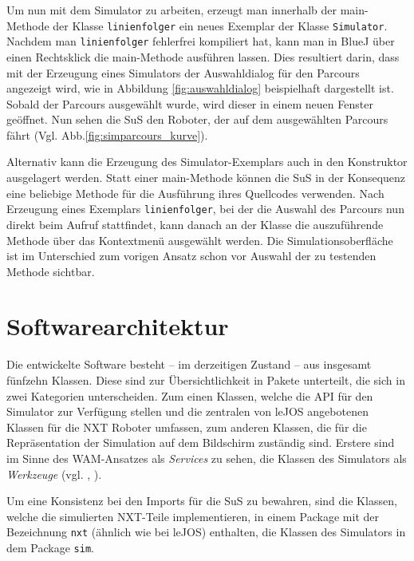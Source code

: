 \documentclass[paper=a4, DIV=calc, BCOR=12mm, twoside=on, onecolumn=on, open = right, titlepage =on, parskip =half-, headsepline = on, footsepline = off, chapterprefix = off, appendixprefix = on, fontsize = 12pt, numbers = noenddot, abstract = on]{scrbook}
\begin{document}
Um nun mit dem Simulator zu arbeiten, erzeugt man innerhalb der main-Methode der Klasse \texttt{linienfolger} ein neues Exemplar der Klasse \texttt{Si\-mu\-la\-tor}. Nachdem man \texttt{linienfolger} fehlerfrei kompiliert hat, kann man in BlueJ über einen Rechtsklick die main-Me\-tho\-de ausführen lassen. Dies resultiert darin, dass mit der Erzeugung eines Simulators der Auswahldialog für den Parcours angezeigt wird, wie in Abbildung \ref{fig:auswahldialog} beispielhaft dargestellt ist.
Sobald der Parcours ausgewählt wurde, wird dieser in einem neuen Fenster geöffnet. Nun sehen die SuS den Roboter, der auf dem ausgewählten Parcours fährt (Vgl. Abb.\ref{fig:simparcours_kurve}).

Alternativ kann die Erzeugung des Simulator-Exemplars auch in den Konstruktor ausgelagert werden. Statt einer main-Methode können die SuS in der Konsequenz eine beliebige Methode für die Ausführung ihres Quellcodes verwenden. Nach Erzeugung eines Exemplars \texttt{linienfolger}, bei der die Auswahl des Parcours nun direkt beim Aufruf stattfindet, kann danach an der Klasse die auszuführende Methode über das Kontextmenü ausgewählt werden. Die Simulationsoberfläche ist im Unterschied zum vorigen Ansatz schon vor Auswahl der zu testenden Methode sichtbar. 


\par \singlespacing
\section{Softwarearchitektur}
\onehalfspacing 

Die entwickelte Software besteht -- im derzeitigen Zustand -- aus insgesamt fünfzehn Klassen. Diese sind zur Übersichtlichkeit in Pakete unterteilt, die sich in zwei Kategorien unterscheiden. Zum einen Klassen, welche die API für den Simulator zur Verfügung stellen und die zentralen von leJOS angebotenen Klassen für die NXT Roboter umfassen, zum anderen Klassen, die für die Repräsentation der Simulation auf dem Bildschirm zuständig sind. Erstere sind im Sinne des WAM-Ansatzes als \emph{Services} zu sehen, die Klassen des Simulators als \emph{Werkzeuge} (vgl. \cite[S. 61ff.]{züllighoven:90}, \cite[S. 35f.]{lilienthal:08}). 

Um eine Konsistenz bei den Imports für die SuS zu bewahren, sind die Klassen, welche die simulierten NXT-Teile implementieren, in einem Package mit der Bezeichnung \texttt{nxt} (ähnlich wie bei leJOS) enthalten, die Klassen des Simulators in dem Package \texttt{sim}. 
\end{document}
